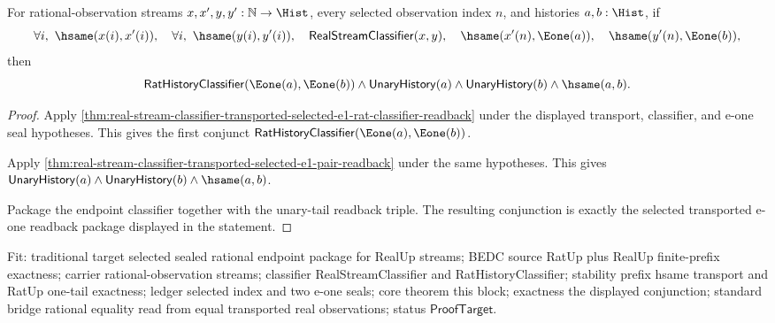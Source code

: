 \begin{theorem}
\label{thm:real-stream-classifier-transported-selected-e1-full-readback-package}
For rational-observation streams $x,x',y,y':\mathbb{N}\to\Hist$, every selected
observation index $n$, and histories $a,b:\Hist$, if
$$
\forall i,\ \hsame(x(i),x'(i)),\quad
\forall i,\ \hsame(y(i),y'(i)),\quad
\mathsf{RealStreamClassifier}(x,y),\quad
\hsame(x'(n),\Eone(a)),\quad
\hsame(y'(n),\Eone(b)),
$$
then
$$
\mathsf{RatHistoryClassifier}(\Eone(a),\Eone(b))\land
\mathsf{UnaryHistory}(a)\land \mathsf{UnaryHistory}(b)\land \hsame(a,b).
$$
\end{theorem}
\begin{proof}
Apply
\autoref{thm:real-stream-classifier-transported-selected-e1-rat-classifier-readback}
under the displayed transport, classifier, and e-one seal hypotheses. This gives
the first conjunct
$\mathsf{RatHistoryClassifier}(\Eone(a),\Eone(b))$.

Apply
\autoref{thm:real-stream-classifier-transported-selected-e1-pair-readback}
under the same hypotheses. This gives
$\mathsf{UnaryHistory}(a)\land \mathsf{UnaryHistory}(b)\land \hsame(a,b)$.

Package the endpoint classifier together with the unary-tail readback triple.
The resulting conjunction is exactly the selected transported e-one readback
package displayed in the statement.
\end{proof}

Fit: traditional target selected sealed rational endpoint package for RealUp
streams; BEDC source RatUp plus RealUp finite-prefix exactness; carrier
rational-observation streams; classifier RealStreamClassifier and
RatHistoryClassifier; stability prefix hsame transport and RatUp one-tail
exactness; ledger selected index and two e-one seals; core theorem this block;
exactness the displayed conjunction; standard bridge rational equality read from
equal transported real observations; status $\mathsf{ProofTarget}$.

